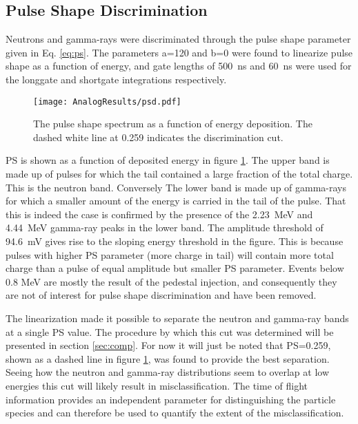 \documentclass[main.tex]{subfiles}
\begin{document}
\subsection{Pulse Shape Discrimination}
Neutrons and gamma-rays were discriminated through the pulse shape parameter given in Eq. \ref{eq:ps}. The parameters a=120 and b=0 were found to linearize pulse shape as a function of energy, and gate lengths of \SI{500}{\ns} and \SI{60}{ns} were used for the longgate and shortgate integrations respectively.

\begin{figure}[ht]
    \centering
        \texttt{[image: AnalogResults/psd.pdf]}
        \caption[PSD spectrum, analog setup.]{The pulse shape spectrum as a function of energy deposition. The dashed white line at 0.259 indicates the discrimination cut.}
        \label{fig:psd_a}
\end{figure}

PS is shown as a function of deposited energy in figure \ref{fig:psd_a}. The upper band is made up of pulses for which the tail contained a large fraction of the total charge. This is the neutron band. Conversely The lower band is made up of gamma-rays for which a smaller amount of the energy is carried in the tail of the pulse. That this is indeed the case is confirmed by the presence of the \SI{2.23}{MeV} and \SI{4.44}{MeV} gamma-ray peaks in the lower band. The amplitude threshold of \SI{94.6}{mV} gives rise to the sloping energy threshold in the figure. This is because pulses with higher PS parameter (more charge in tail) will contain more total charge than a pulse of equal amplitude but smaller PS parameter.
Events below 0.8 MeV are mostly the result of the pedestal injection, and consequently they are not of interest for pulse shape discrimination and have been removed.

The linearization made it possible to separate the neutron and gamma-ray bands at a single PS value. The procedure by which this cut was determined will be presented in section \ref{sec:comp}. For now it will just be noted that PS=0.259, shown as a dashed line in figure \ref{fig:psd_a}, was found to provide the best separation. Seeing how the neutron and gamma-ray distributions seem to overlap at low energies this cut will likely result in misclassification. The time of flight information provides an independent parameter for distinguishing the particle species and can therefore be used to quantify the extent of the misclassification.
\end{document}

